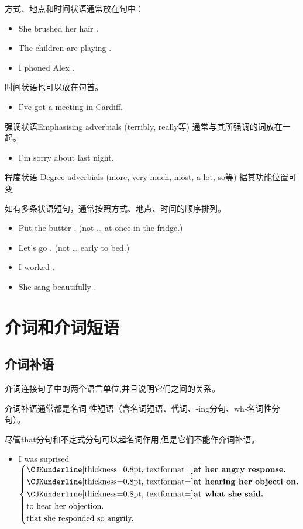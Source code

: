 方式、地点和时间状语通常放在句中：
\begin{itemize}
\item She brushed her hair .
\item The children are playing .
\item I phoned Alex .
\end{itemize}

时间状语也可以放在句首。
\begin{itemize}
\item {} I've got a meeting in Cardiff.
\end{itemize}

强调状语Emphasising adverbials (terribly, really等) 通常与其所强调的词放在一
起。
\begin{itemize}
\item I'm  sorry about last night.
\end{itemize}

程度状语 Degree adverbials (more, very much, most, a lot, so等) 据其功能位置可变

如有多条状语短句，通常按照方式、地点、时间的顺序排列。
\begin{itemize}
\item Put the butter  . (not … at once in the fridge.)
\item Let's go  . (not … early to bed.)
\item I worked  .
\item She sang beautifully  .
\end{itemize}


\section{介词和介词短语}

\subsection{介词补语}

介词连接句子中的两个语言单位,并且说明它们之间的关系。

介词补语通常都是名词
性短语（含名词短语、代词、-ing分句、wh-名词性分句）。

尽管that分句和不定式分句可以起名词作用,但是它们不能作介词补语。

\begin{itemize}
\item I was suprised $ \left\{
    \begin{aligned}
     &\text{\unbf{at} her angry response.}\\
     &\text{\unbf{at} hearing her objecti on.}\\
     &\text{\unbf{at} what she said.}\\
     &\text{to hear her objection.}\\
     &\text{that she responded so angrily. }
    \end{aligned}
  \right. $

\end{itemize}

